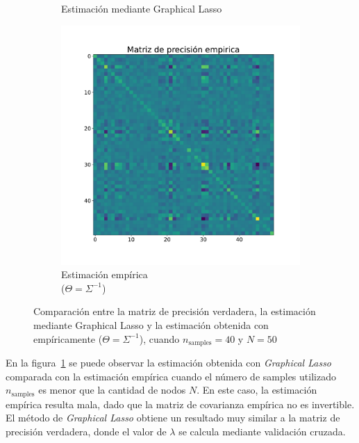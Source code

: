 \documentclass{article}
\begin{document}
\begin{figure}[htb]
\begin{subfigure}[t]{0.32\linewidth}
        \caption{Estimación mediante Graphical Lasso}
    \end{subfigure}\hfill
    \begin{subfigure}[t]{0.32\linewidth}
        \centering
        \includegraphics[width=\textwidth]{imagenes/graphical_lasso/estimated_sample.pdf}
        \caption{Estimación empírica \\ ($\Theta = \Sigma^{-1}$)}
    \end{subfigure}
    \caption{Comparación entre la matriz de precisión verdadera, la estimación mediante Graphical Lasso y la estimación obtenida con empíricamente ($\Theta = \Sigma^{-1}$), cuando $n_{\text{samples}}=40$ y $N=50$}
    \label{fig:graphical_lasso_triptych}
\end{figure}
En la figura~\ref{fig:graphical_lasso_triptych} se puede observar la estimación obtenida con \emph{Graphical Lasso} comparada con la estimación empírica cuando el número de samples utilizado $n_{\text{samples}}$ es menor que la cantidad de nodos $N$. En este caso, la estimación
empírica resulta mala, dado que la matriz de covarianza empírica no es invertible. El método de \emph{Graphical Lasso} obtiene un resultado muy similar a la matriz de precisión verdadera, donde el valor de $\lambda$ se calcula mediante validación cruzada. 
\end{document}
